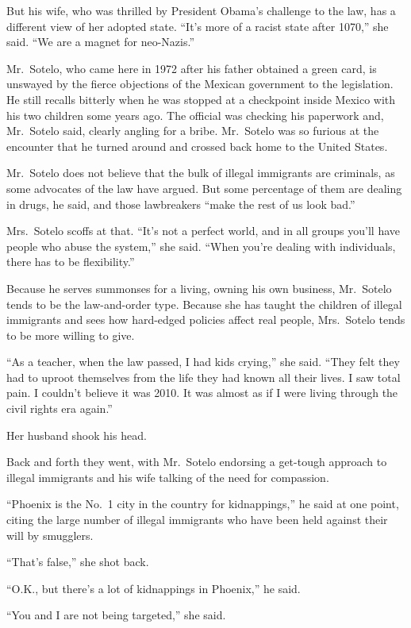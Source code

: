 ﻿\documentclass[12pt]{article}
\begin{document}
But his wife, who was thrilled by President Obama's challenge to the law, has a different view of
her adopted state. ``It's more of a racist state after 1070,'' she said. ``We are a magnet for
neo-Nazis.''

Mr.~Sotelo, who came here in 1972 after his father obtained a green card, is unswayed by the fierce
objections of the Mexican government to the legislation. He still recalls bitterly when he was
stopped at a checkpoint inside Mexico with his two children some years ago. The official was
checking his paperwork and, Mr.~Sotelo said, clearly angling for a bribe. Mr.~Sotelo was so furious
at the encounter that he turned around and crossed back home to the United States.

Mr.~Sotelo does not believe that the bulk of illegal immigrants are criminals, as some advocates of
the law have argued. But some percentage of them are dealing in drugs, he said, and those
lawbreakers ``make the rest of us look bad.''

Mrs.~Sotelo scoffs at that. ``It's not a perfect world, and in all groups you'll have people who
abuse the system,'' she said. ``When you're dealing with individuals, there has to be flexibility.''

Because he serves summonses for a living, owning his own business, Mr.~Sotelo tends to be the
law-and-order type. Because she has taught the children of illegal immigrants and sees how
hard-edged policies affect real people, Mrs.~Sotelo tends to be more willing to give.

``As a teacher, when the law passed, I had kids crying,'' she said. ``They felt they had to uproot
themselves from the life they had known all their lives. I saw total pain. I couldn't believe it was
2010. It was almost as if I were living through the civil rights era again.''

Her husband shook his head.

Back and forth they went, with Mr.~Sotelo endorsing a get-tough approach to illegal immigrants and
his wife talking of the need for compassion.

``Phoenix is the No.~1 city in the country for kidnappings,'' he said at one point, citing the large
number of illegal immigrants who have been held against their will by smugglers.

``That's false,'' she shot back.

``O.K., but there's a lot of kidnappings in Phoenix,'' he said.

``You and I are not being targeted,'' she said.
\end{document}
